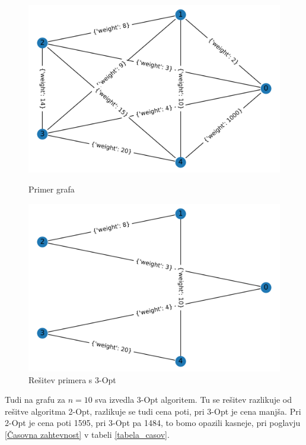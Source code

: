 \documentclass[12pt, a4paper]{article}
\begin{document}
\begin{figure}[!h]
    
    \begin{minipage}{0.5\textwidth}
    \includegraphics[width=8 cm]{primeri/primer1.png}
    \caption{Primer grafa}
    \label{primer_3_opt}
  \end{minipage}
 \hspace{1cm}
  \begin{minipage}{0.5\textwidth}
    \includegraphics[width=8 cm]{primeri/primer1_3opt.png}
    \caption{Rešitev primera s 3-Opt}
    \label{resitev_3_opt}
  \end{minipage}
    
\end{figure}

Tudi na grafu za $n=10$ sva izvedla 3-Opt algoritem. Tu se rešitev razlikuje od rešitve algoritma 2-Opt, razlikuje se tudi cena poti, pri 3-Opt je cena manjša. Pri 2-Opt je cena poti 1595, pri 3-Opt pa 1484, to bomo opazili kasneje, pri poglavju \ref{Časovna zahtevnost} v tabeli \ref{tabela_casov}.
\end{document}
